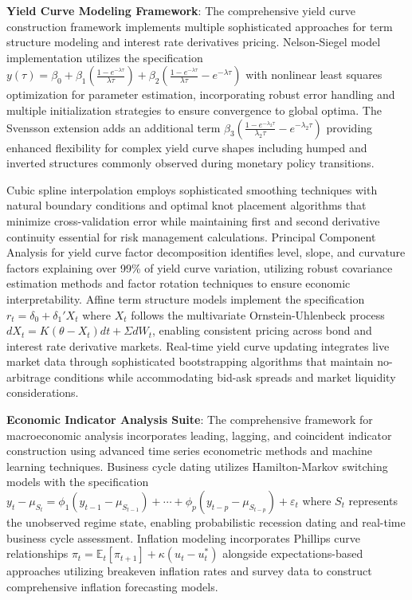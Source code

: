 \documentclass[12pt,a4paper]{article}
\theoremstyle{definition}
\theoremstyle{remark}
\begin{document}
\textbf{Yield Curve Modeling Framework}: The comprehensive yield curve construction framework implements multiple sophisticated approaches for term structure modeling and interest rate derivatives pricing. Nelson-Siegel model implementation utilizes the specification $y(\tau) = \beta_0 + \beta_1\left(\frac{1-e^{-\lambda\tau}}{\lambda\tau}\right) + \beta_2\left(\frac{1-e^{-\lambda\tau}}{\lambda\tau} - e^{-\lambda\tau}\right)$ with nonlinear least squares optimization for parameter estimation, incorporating robust error handling and multiple initialization strategies to ensure convergence to global optima. The Svensson extension adds an additional term $\beta_3\left(\frac{1-e^{-\lambda_2\tau}}{\lambda_2\tau} - e^{-\lambda_2\tau}\right)$ providing enhanced flexibility for complex yield curve shapes including humped and inverted structures commonly observed during monetary policy transitions.

Cubic spline interpolation employs sophisticated smoothing techniques with natural boundary conditions and optimal knot placement algorithms that minimize cross-validation error while maintaining first and second derivative continuity essential for risk management calculations. Principal Component Analysis for yield curve factor decomposition identifies level, slope, and curvature factors explaining over 99\% of yield curve variation, utilizing robust covariance estimation methods and factor rotation techniques to ensure economic interpretability. Affine term structure models implement the specification $r_t = \delta_0 + \delta_1' X_t$ where $X_t$ follows the multivariate Ornstein-Uhlenbeck process $dX_t = K(\theta - X_t)dt + \Sigma dW_t$, enabling consistent pricing across bond and interest rate derivative markets. Real-time yield curve updating integrates live market data through sophisticated bootstrapping algorithms that maintain no-arbitrage conditions while accommodating bid-ask spreads and market liquidity considerations.

\textbf{Economic Indicator Analysis Suite}: The comprehensive framework for macroeconomic analysis incorporates leading, lagging, and coincident indicator construction using advanced time series econometric methods and machine learning techniques. Business cycle dating utilizes Hamilton-Markov switching models with the specification $y_t - \mu_{S_t} = \phi_1(y_{t-1} - \mu_{S_{t-1}}) + \cdots + \phi_p(y_{t-p} - \mu_{S_{t-p}}) + \varepsilon_t$ where $S_t$ represents the unobserved regime state, enabling probabilistic recession dating and real-time business cycle assessment. Inflation modeling incorporates Phillips curve relationships $\pi_t = \mathbb{E}_t[\pi_{t+1}] + \kappa(u_t - u_t^*)$ alongside expectations-based approaches utilizing breakeven inflation rates and survey data to construct comprehensive inflation forecasting models.
\end{document}
